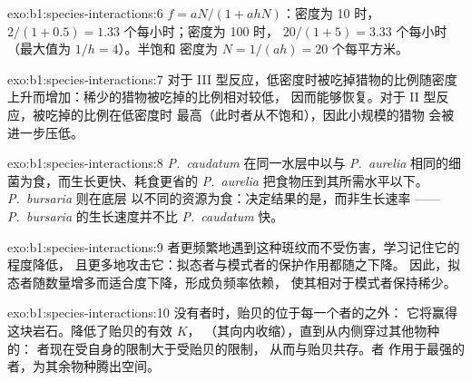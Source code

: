 \begin{solution}{exo:b1:species-interactions:6}
$f = aN/(1 + ahN)$：密度为 10 时，$2/(1 + 0.5) = 1.33$ 个每小时；密度为 100 时，
$20/(1 + 5) = 3.33$ 个每小时（最大值为 $1/h = 4$）。半饱和
密度为 $N = 1/(ah) = 20$ 个每平方米。
\end{solution}

\begin{solution}{exo:b1:species-interactions:7}
对于 III 型反应，低密度时被吃掉猎物的比例随密度
上升而增加：稀少的猎物被吃掉的比例相对较低，
因而能够恢复。对于 II 型反应，被吃掉的比例在低密度时
最高（此时者从不饱和），因此小规模的猎物
会被进一步压低。
\end{solution}

\begin{solution}{exo:b1:species-interactions:8}
\emph{P.~caudatum} 在同一水层中以与
\emph{P.~aurelia} 相同的细菌为食，而生长更快、耗食更省的 \emph{P.~aurelia}
把食物压到其所需水平以下。\emph{P.~bursaria} 则在底层
以不同的资源为食：决定结果的是，而非生长速率
——\emph{P.~bursaria} 的生长速度并不比 \emph{P.~caudatum} 快。
\end{solution}

\begin{solution}{exo:b1:species-interactions:9}
者更频繁地遇到这种斑纹而不受伤害，学习记住它的程度降低，
且更多地攻击它：拟态者与模式者的保护作用都随之下降。
因此，拟态者随数量增多而适合度下降，形成负频率依赖，
使其相对于模式者保持稀少。
\end{solution}

\begin{solution}{exo:b1:species-interactions:10}
没有者时，贻贝的位于每一个者的之外：
它将赢得这块岩石。降低了贻贝的有效 $K$，
（其向内收缩），直到从内侧穿过其他物种的：
者现在受自身的限制大于受贻贝的限制，
从而与贻贝共存。者
作用于最强的者，为其余物种腾出空间。
\end{solution}

